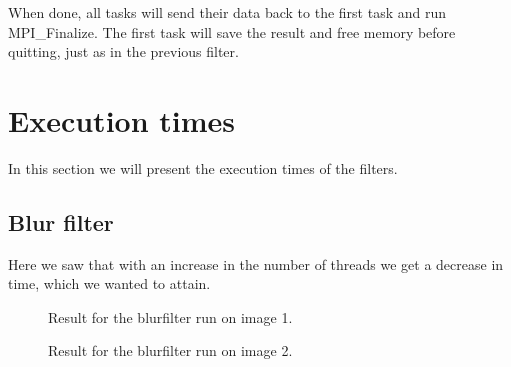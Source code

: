 \documentclass[titlepage, a4paper]{article}
\begin{document}
When done, all tasks will send their data back to the first task and run MPI\_Finalize. The first task will save the result and free memory before quitting, just as in the previous filter.

\section{Execution times}
In this section we will present the execution times of the filters.

\subsection{Blur filter}
Here we saw that with an increase in the number of threads we get a decrease in time, which we wanted to attain.

\begin{figure}[H]
  \centering
  \caption{Result for the blurfilter run on image 1.}
  \label{fig:im1-blur}
\end{figure}

\begin{figure}[H]
  \centering
  \caption{Result for the blurfilter run on image 2.}
  \label{fig:im2-blur}
\end{figure}
\end{document}
